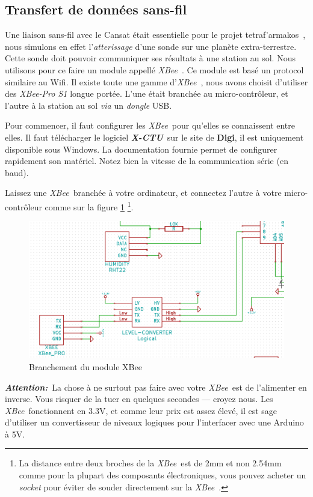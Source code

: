 \documentclass[twocolumn, 8pt]{article}
\newcommand\tet{\textgreek{tetraf'armakos}~}
\newcommand\XB{\emph{XBee}~}
\newcommand\Xctu{\textbf{\emph{X-CTU}}~}
\newcommand\Att{\textbf{\emph{Attention:}}~}
\begin{document}
\subsection{Transfert de données sans-fil}
\par Une liaison sans-fil avec le Cansat était essentielle pour le projet \tet, nous simulons en effet l'\emph{atterissage} d'une sonde sur une planète extra-terrestre. Cette sonde doit pouvoir communiquer ses résultats à une station au sol. Nous utilisons pour ce faire un module appellé \XB. Ce module est basé un protocol similaire au Wifi. Il existe toute une gamme d'\XB, nous avons choisit d'utiliser des \emph{XBee-Pro S1} longue portée. L'une était branchée au micro-contrôleur, et l'autre à la station au sol \textit{via} un \emph{dongle} USB.
\par Pour commencer, il faut configurer les \XB pour qu'elles se connaissent entre elles. Il faut télécharger le logiciel \Xctu sur le site de \textbf{Digi}, il est uniquement disponible sous Windows. La documentation fournie permet de configurer rapidement son matériel. Notez bien la vitesse de la communication série (en baud).
\par Laissez une \XB branchée à votre ordinateur, et connectez l'autre à votre micro-contrôleur comme sur la figure \ref{XBee} \footnote{La distance entre deux broches de la \XB est de 2mm et non 2.54mm comme pour la plupart des composants électroniques, vous pouvez acheter un \emph{socket} pour éviter de souder directement sur la \XB.}.

\begin{figure}[!h]
	\centering
	\includegraphics[scale=.25]{XBee.png}
	\caption{Branchement du module XBee}
	\label{XBee}
\end{figure}

\par \Att La chose à ne surtout pas faire avec votre \XB est de l'alimenter en inverse. Vous risquer de la tuer en quelques secondes --- croyez nous. Les \XB fonctionnent en 3.3V, et comme leur prix est assez élevé, il est sage d'utiliser un convertisseur de niveaux logiques pour l'interfacer avec une Arduino à 5V.
\end{document}
